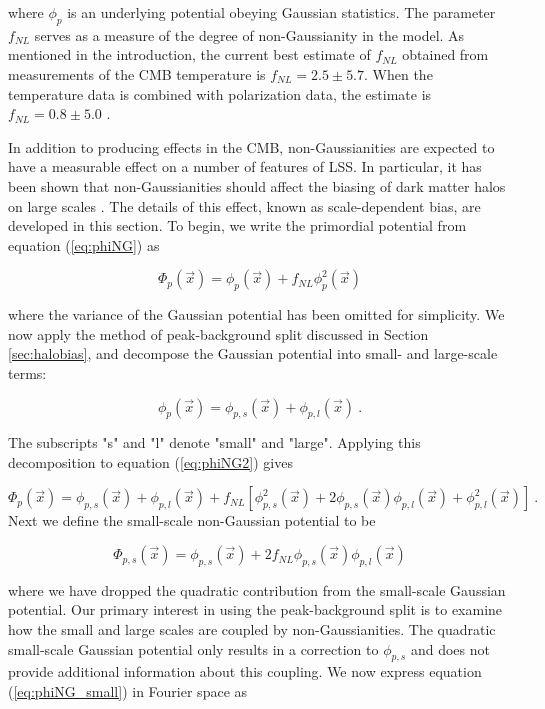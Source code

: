 \documentclass[10pt,letterpaper,final]{iopart}
\numberwithin{equation}{subsection}
\def\ni{\noindent}
\begin{document}
\ni where $\phi_p$ is an underlying potential obeying Gaussian statistics. The parameter $f_{NL}$ serves as a measure of the degree of non-Gaussianity in the model. As mentioned in the introduction, the current best estimate of $f_{NL}$ obtained from measurements of the CMB temperature is $f_{NL} = 2.5 \pm 5.7$. When the temperature data is combined with polarization data, the estimate is $f_{NL} = 0.8 \pm 5.0$ \cite{PlanckNG} . 

In addition to producing effects in the CMB, non-Gaussianities are expected to have a measurable effect on a number of features of LSS. In particular, it has been shown that non-Gaussianities should affect the biasing of dark matter halos on large scales \cite{Dalal}. The details of this effect, known as scale-dependent bias, are developed in this section. To begin, we write the primordial potential from equation (\ref{eq:phiNG}) as

\begin{equation}\label{eq:phiNG2}
\Phi_p(\vec{x}) = \phi_p(\vec{x}) + f_{NL}\phi_p^2(\vec{x})
\end{equation}

\ni where the variance of the Gaussian potential has been omitted for simplicity. We now apply the method of peak-background split discussed in Section \ref{sec:halobias}, and decompose the Gaussian potential into small- and large-scale terms:

\begin{equation}\label{eq:phiLS}
\phi_p(\vec{x}) = \phi_{p,s}(\vec{x}) + \phi_{p,l}(\vec{x}) \ .
\end{equation}

\ni The subscripts "s" and "l" denote "small" and "large". Applying this decomposition to equation (\ref{eq:phiNG2}) gives

\begin{equation}
\Phi_p(\vec{x}) = \phi_{p,s}(\vec{x}) + \phi_{p,l}(\vec{x}) + f_{NL}\left[\phi_{p,s}^2(\vec{x}) + 2\phi_{p,s}(\vec{x})\phi_{p,l} (\vec{x}) + \phi_{p,l}^2(\vec{x}) \right] \ .
\end{equation}
\ni Next we define the small-scale non-Gaussian potential to be 

\begin{equation}\label{eq:phiNG_small}
\Phi_{p,s}(\vec{x}) = \phi_{p,s}(\vec{x}) + 2f_{NL}\phi_{p,s}(\vec{x})\phi_{p,l}(\vec{x})
\end{equation}

\ni where we have dropped the quadratic contribution from the small-scale Gaussian potential. Our primary interest in using the peak-background split is to examine how the small and large scales are coupled by non-Gaussianities. The quadratic small-scale Gaussian potential only results in a correction to $\phi_{p,s}$ and does not provide additional information about this coupling. We now express equation (\ref{eq:phiNG_small}) in Fourier space as
\end{document}
